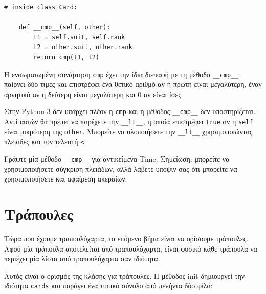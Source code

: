 \documentclass[10pt]{book}
\begin{document}
\begin{verbatim}
# inside class Card:

    def __cmp__(self, other):
        t1 = self.suit, self.rank
        t2 = other.suit, other.rank
        return cmp(t1, t2)
\end{verbatim}
%
Η ενσωματωμένη συνάρτηση {\tt cmp} έχει την ίδια διεπαφή με τη μέθοδο
\verb"__cmp__": παίρνει δύο τιμές και επιστρέφει ένα θετικό αριθμό αν η πρώτη είναι
μεγαλύτερη, έναν αρνητικό αν η δεύτερη είναι μεγαλύτερη και 0 αν είναι ίσες.

Στην Python 3 δεν υπάρχει πλέον η {\tt cmp} και η μέθοδος \verb"__cmp__" δεν υποστηρίζεται. Αντί
αυτών θα πρέπει να παρέχετε την \verb"__lt__", η οποία επιστρέφει {\tt True} αν η {\tt self} είναι
μικρότερη της {\tt other}. Μπορείτε να υλοποιήσετε την \verb"__lt__" χρησιμοποιώντας πλειάδες και
τον τελεστή \verb"<".
\\

 
\begin{exercise}

Γράψτε μία μέθοδο \verb"__cmp__" για αντικείμενα Time. Σημείωση: μπορείτε να χρησιμοποιήσετε
σύγκριση πλειάδων, αλλά λάβετε υπόψιν σας ότι μπορείτε να χρησιμοποιήσετε και αφαίρεση ακεραίων.	

\end{exercise}




\section{Τράπουλες}

Τώρα που έχουμε τραπουλόχαρτα, το επόμενο βήμα είναι να ορίσουμε τράπουλες.  Αφού μία 
τράπουλα αποτελείται από τραπουλόχαρτα, είναι φυσικό κάθε τράπουλα να περιέχει μία λίστα 
από τραπουλόχαρτα σαν ιδιότητα.

Αυτός είναι ο ορισμός της κλάσης για τράπουλες.  Η μέθοδος init δημιουργεί 
την ιδιότητα {\tt cards} και παράγει ένα τυπικό σύνολο από πενήντα δύο φίλα:
\end{document}
